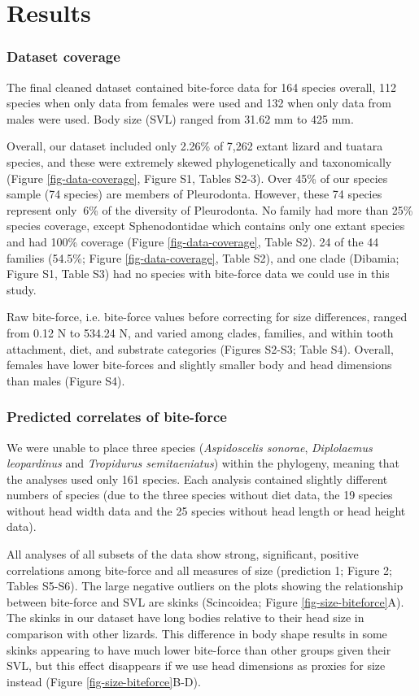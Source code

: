\documentclass[a4paper, 12pt]{article}
\begin{document}
\section{Results}

\subsubsection{Dataset coverage}
The final cleaned dataset contained bite-force data for 164 species overall, 112 species when only data from females were used and 132 when only data from males were used. 
Body size (SVL) ranged from 31.62 mm to 425 mm.
 

Overall, our dataset included only 2.26\% of 7,262 extant lizard and tuatara species\cite{uetz2020reptile}, and these were extremely skewed phylogenetically and taxonomically (Figure \ref{fig-data-coverage}, Figure S1, Tables S2-3). 
Over 45\% of our species sample (74 species) are members of Pleurodonta. 
However, these 74 species represent only $~6$\% of the diversity of Pleurodonta. 
No family had more than 25\% species coverage, except Sphenodontidae which contains only one extant species and had 100\% coverage (Figure \ref{fig-data-coverage}, Table S2). 
24 of the 44 families (54.5\%; Figure \ref{fig-data-coverage}, Table S2), and one clade (Dibamia; Figure S1, Table S3) had no species with bite-force data we could use in this study. 

Raw bite-force, i.e. bite-force values before correcting for size differences, ranged from 0.12 N to 534.24 N, and varied among clades, families, and within tooth attachment, diet, and substrate categories (Figures S2-S3; Table S4). 
Overall, females have lower bite-forces and slightly smaller body and head dimensions than males (Figure S4).

\subsubsection{Predicted correlates of bite-force}
We were unable to place three species (\textit{Aspidoscelis sonorae}, \textit{Diplolaemus leopardinus} and \textit{Tropidurus semitaeniatus}) within the phylogeny, meaning that the analyses used only 161 species. 
Each analysis contained slightly different numbers of species (due to the three species without diet data, the 19 species without head width data and the 25 species without head length or head height data).

All analyses of all subsets of the data show strong, significant, positive correlations among bite-force and all measures of size (prediction 1; Figure 2; Tables S5-S6). 
The large negative outliers on the plots showing the relationship between bite-force and SVL are skinks (Scincoidea; Figure \ref{fig-size-biteforce}A). 
The skinks in our dataset have long bodies relative to their head size in comparison with other lizards. 
This difference in body shape results in some skinks appearing to have much lower bite-force than other groups given their SVL, but this effect disappears if we use head dimensions as proxies for size instead (Figure \ref{fig-size-biteforce}B-D).
\end{document}
